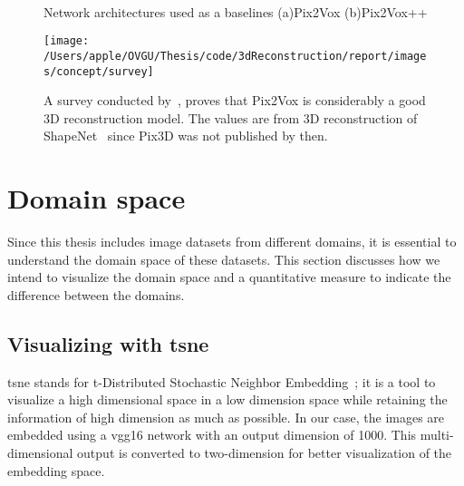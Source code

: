 \begin{figure}[!ht]
    \centering
    \quad
    \\
    \caption{Network architectures used as a baselines (a)Pix2Vox (b)Pix2Vox++}
    \label{fig:architectures}
\end{figure}

\begin{figure}
    \centering
    \texttt{[image: /Users/apple/OVGU/Thesis/code/3dReconstruction/report/images/concept/survey]}
    \caption{A survey conducted by~\cite{Han2021ImageBased3O}, proves that Pix2Vox is considerably a good 3D reconstruction model.
    The values are from 3D reconstruction of ShapeNet~\cite{chang2015shapenet} since Pix3D was not published by then.}
    \label{fig:survey on 3d reconstruction}
\end{figure}


\section{Domain space}\label{sec:domain-space}

Since this thesis includes image datasets from different domains, it is essential to understand the domain space of these datasets.
This section discusses how we intend to visualize the domain space and a quantitative measure to indicate the difference between the domains.

\subsection{Visualizing with \gls{tsne}}\label{subsec:visualizing-with-tsne}
\gls{tsne} stands for t-Distributed Stochastic Neighbor Embedding~\cite{vanDerMaaten2008}; it is a tool to visualize a high dimensional space in a low dimension space while retaining the information of high dimension as much as possible.
In our case, the images are embedded using a \gls{vgg}16 network with an output dimension of 1000.
This multi-dimensional output is converted to two-dimension for better visualization of the embedding space.

